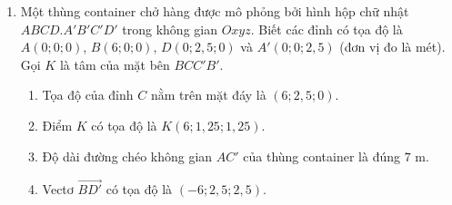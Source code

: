 \documentclass[12pt]{article}
\begin{document}
\begin{enumerate}[label=\textbf{Câu \arabic*:}, leftmargin=*]
\begin{figure}[H]
		\end{figure}
		
		\begin{enumerate}[label=\alph*)]
			\item Tọa độ điểm $M$ tại thời điểm $t$ giờ là $M(6+t; 6+2t; -3+2t)$.
			\item Vị trí ban đầu của tàu ngầm lúc bắt đầu nổi ($t=0$) là điểm có tọa độ $(6; 6; 0)$.
			\item Tọa độ của vectơ $\overrightarrow{MB}$ là $(4-t; 4-2t; 3-2t)$.
			\item Tàu ngầm $S$ đạt khoảng cách gần nhất so với phao tiêu $B$ khi $t = 2$ giờ. Khoảng cách gần nhất đó đúng bằng $5\text{ km}$.
		\end{enumerate}
		
		\vspace{3mm}
		\item Một thùng container chở hàng được mô phỏng bởi hình hộp chữ nhật $ABCD.A'B'C'D'$ trong không gian $Oxyz$. Biết các đỉnh có tọa độ là $A(0;0;0)$, $B(6;0;0)$, $D(0; 2,5; 0)$ và $A'(0; 0; 2,5)$ (đơn vị đo là mét). Gọi $K$ là tâm của mặt bên $BCC'B'$.
		\begin{enumerate}[label=\alph*)]
			\item Tọa độ của đỉnh $C$ nằm trên mặt đáy là $(6; 2,5; 0)$.
			\item Điểm $K$ có tọa độ là $K(6; 1,25; 1,25)$.
			\item Độ dài đường chéo không gian $AC'$ của thùng container là đúng $7\text{ m}$.
			\item Vectơ $\overrightarrow{BD'}$ có tọa độ là $(-6; 2,5; 2,5)$.
		\end{enumerate}
		

\end{enumerate}
\end{document}
